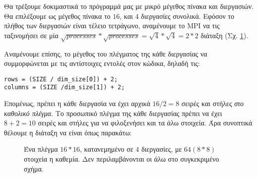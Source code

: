 \begin{multicols}{2}
Θα τρέξουμε δοκιμαστικά το πρόγραμμά μας με μικρό μέγεθος πίνακα και διεργασιών. Θα επιλέξουμε ως μέγεθος πίνακα το $16$, και $4$ διεργασίες συνολικά. Εφόσον το πλήθος των διεργασιών είναι τέλειο τετράγωνο, αναμένουμε το MPI να τις ταξινομήσει σε μία $\sqrt{processes}*\sqrt{processes}=\sqrt{4}*\sqrt{4}=2*2$ διάταξη (Σχ. \ref{fig:4processes}). \par
Αναμένουμε επίσης, το μέγεθος του πλέγματος της κάθε διεργασίας να συμμορφώνεται με τις αντίστοιχες εντολές στον κώδικα, δηλαδή τις:
\begin{verbatim}
rows = (SIZE / dim_size[0]) + 2;
columns = (SIZE /dim_size[1]) + 2;
\end{verbatim}

Επομένως, πρέπει η κάθε διεργασία να έχει αρχικά $16/2=8$ σειρές και στήλες \emph{στο καθολικό πλέγμα}. Το προσωπικό πλέγμα της κάθε διεργασίας πρέπει να έχει $8+2=10$ σειρές και στήλες για να φιλοξενήσει και τα άλω στοιχεία. Άρα συνοπτικά θέλουμε η διάταξη να είναι όπως παρακάτω:
\end{multicols}

\begin{figure}[h]
\centering
{}
\caption{Ένα πλέγμα $16*16$, κατανεμημένο σε $4$ διεργασίες, με $64 (8*8)$ στοιχεία η καθεμία. Δεν περιλαμβάνονται οι άλω στο συγκεκριμένο σχήμα.}
\label{fig:4processes}
\end{figure}

